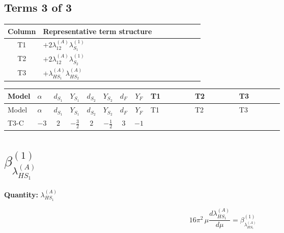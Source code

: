 \documentclass[8pt]{article}
\begin{document}
\begin{landscape}
\subsection*{Terms 3 of 3}
\begin{center}
\begin{tabular}{@{}c >{\raggedright\arraybackslash}p{0.82\linewidth}@{}}
\toprule
Column & Representative term structure \\
\midrule
T1 & \(\displaystyle +2 {\lambda_{12}^{(A)}} {\lambda_{S_1}^{(1)}}\) \\
\midrule
T2 & \(\displaystyle +2 {\lambda_{12}^{(A)}} {\lambda_{S_2}^{(1)}}\) \\
\midrule
T3 & \(\displaystyle +{\lambda_{HS_1}^{(A)}} {\lambda_{HS_2}^{(A)}}\) \\
\midrule
\bottomrule
\end{tabular}
\end{center}
\smallskip
\tiny
\begin{longtable}{@{}llcccccc >{\raggedright\arraybackslash}p{0.21\linewidth} >{\raggedright\arraybackslash}p{0.21\linewidth} >{\raggedright\arraybackslash}p{0.21\linewidth}@{}}
\toprule
Model & $\alpha$ & $d_{S_1}$ & $Y_{S_1}$ & $d_{S_2}$ & $Y_{S_2}$ & $d_F$ & $Y_F$ & T1 & T2 & T3 \\
\midrule
\endfirsthead
\toprule
Model & $\alpha$ & $d_{S_1}$ & $Y_{S_1}$ & $d_{S_2}$ & $Y_{S_2}$ & $d_F$ & $Y_F$ & T1 & T2 & T3 \\
\midrule
\endhead
T3-C & $-3$ & $2$ & $-\frac{3}{2}$ & $2$ & $-\frac{1}{2}$ & $3$ & $-1$ & \scriptsize\adjustbox{max width=\linewidth}{$\begin{gathered} +2 {\lambda_{12}^{(A)}} {\lambda_{S_1}^{(1)}}\end{gathered}$} & \scriptsize\adjustbox{max width=\linewidth}{$\begin{gathered} +2 {\lambda_{12}^{(A)}} {\lambda_{S_2}^{(1)}}\end{gathered}$} & \scriptsize\adjustbox{max width=\linewidth}{$\begin{gathered} +{\lambda_{HS_1}^{(A)}} {\lambda_{HS_2}^{(A)}}\end{gathered}$} \\
\midrule
\bottomrule
\end{longtable}
\clearpage
\section*{$\beta_{\lambda_{HS_1}^{(A)}}^{(1)}$}
\noindent\textbf{Quantity: }$\lambda_{HS_1}^{(A)}$\par\smallskip
\[16\pi^2\,\mu\frac{d \lambda_{HS_1}^{(A)}}{d\mu}=\beta_{\lambda_{HS_1}^{(A)}}^{(1)}\]

\end{landscape}
\end{document}

